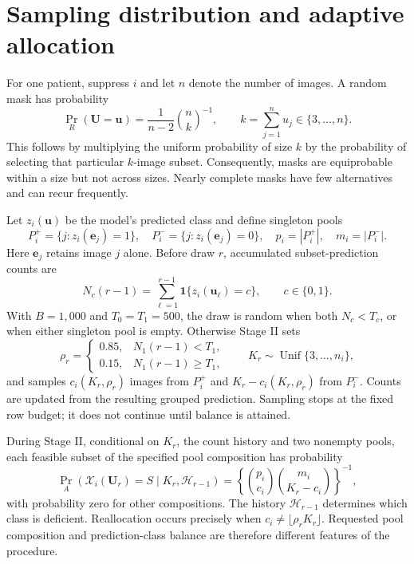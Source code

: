 \section{Sampling distribution and adaptive allocation}\label{app:sampling}
For one patient, suppress $i$ and let $n$ denote the number of images. A random mask has probability
\begin{equation}
\Pr_R(\boldsymbol U=\boldsymbol u)=
\frac{1}{n-2}\binom{n}{k}^{-1},\qquad
k=\sum_{j=1}^n u_j\in\{3,\ldots,n\}.
\label{eq:maskprob}
\end{equation}
This follows by multiplying the uniform probability of size $k$ by the probability of selecting that particular $k$-image subset. Consequently, masks are equiprobable within a size but not across sizes. Nearly complete masks have few alternatives and can recur frequently.

Let $z_i(\boldsymbol u)$ be the model's predicted class and define singleton pools
\begin{equation}
P_i^+=\{j:z_i(\boldsymbol e_j)=1\},\quad
P_i^-=\{j:z_i(\boldsymbol e_j)=0\},\quad
p_i=|P_i^+|,\quad m_i=|P_i^-|.
\end{equation}
Here $\boldsymbol e_j$ retains image $j$ alone. Before draw $r$, accumulated subset-prediction counts are
\begin{equation}
N_c(r-1)=\sum_{\ell=1}^{r-1}\mathbf 1\{z_i(\boldsymbol u_\ell)=c\},
\qquad c\in\{0,1\}.
\end{equation}
With $B=1{,}000$ and $T_0=T_1=500$, the draw is random when both $N_c<T_c$, or when either singleton pool is empty. Otherwise Stage II sets
\begin{equation}
\rho_r=\begin{cases}0.85,&N_1(r-1)<T_1,\\0.15,&N_1(r-1)\ge T_1,\end{cases}
\qquad K_r\sim\operatorname{Unif}\{3,\ldots,n_i\},
\end{equation}
and samples $c_i(K_r,\rho_r)$ images from $P_i^+$ and $K_r-c_i(K_r,\rho_r)$ from $P_i^-$. Counts are updated from the resulting grouped prediction. Sampling stops at the fixed row budget; it does not continue until balance is attained.

During Stage II, conditional on $K_r$, the count history and two nonempty pools, each feasible subset of the specified pool composition has probability
\begin{equation}
\Pr_A(\mathcal X_i(\boldsymbol U_r)=S\mid K_r,\mathcal H_{r-1})=
\left\{\binom{p_i}{c_i}\binom{m_i}{K_r-c_i}\right\}^{-1},
\end{equation}
with probability zero for other compositions. The history $\mathcal H_{r-1}$ determines which class is deficient. Reallocation occurs precisely when $c_i\ne\lfloor\rho_rK_r\rfloor$. Requested pool composition and prediction-class balance are therefore different features of the procedure.

